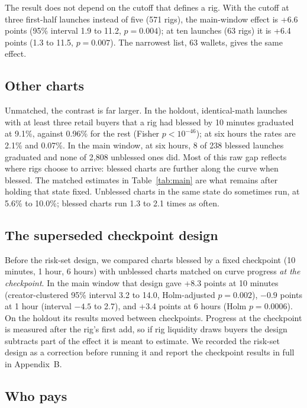 \documentclass{ledger}
\begin{document}
The result does not depend on the cutoff that defines a rig. With the cutoff at three first-half launches instead of five (571 rigs), the main-window effect is +6.6 points (95\% interval 1.9 to 11.2, $p = 0.004$); at ten launches (63 rigs) it is +6.4 points (1.3 to 11.5, $p = 0.007$). The narrowest list, 63 wallets, gives the same effect.

\subsection{Other charts}\label{others}

Unmatched, the contrast is far larger. In the holdout, identical-math launches with at least three retail buyers that a rig had blessed by 10 minutes graduated at 9.1\%, against 0.96\% for the rest (Fisher $p < 10^{-46}$); at six hours the rates are 2.1\% and 0.07\%. In the main window, at six hours, 8 of 238 blessed launches graduated and none of 2,808 unblessed ones did. Most of this raw gap reflects where rigs choose to arrive: blessed charts are further along the curve when blessed. The matched estimates in Table~\ref{tab:main} are what remains after holding that state fixed. Unblessed charts in the same state do sometimes run, at 5.6\% to 10.0\%; blessed charts run 1.3 to 2.1 times as often.

\subsection{The superseded checkpoint design}\label{superseded}

Before the risk-set design, we compared charts blessed by a fixed checkpoint (10 minutes, 1 hour, 6 hours) with unblessed charts matched on curve progress \emph{at the checkpoint}. In the main window that design gave +8.3 points at 10 minutes (creator-clustered 95\% interval 3.2 to 14.0, Holm-adjusted $p = 0.002$), $-0.9$ points at 1 hour (interval $-4.5$ to 2.7), and +3.4 points at 6 hours (Holm $p = 0.0006$). On the holdout its results moved between checkpoints. Progress at the checkpoint is measured after the rig's first add, so if rig liquidity draws buyers the design subtracts part of the effect it is meant to estimate. We recorded the risk-set design as a correction before running it and report the checkpoint results in full in Appendix~B.

\subsection{Who pays}
\end{document}
